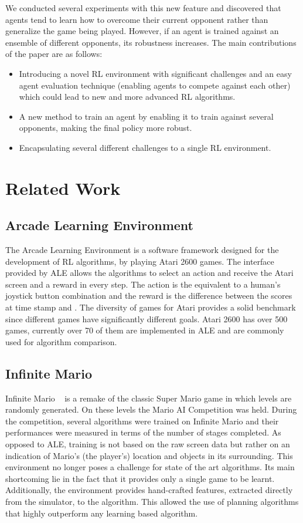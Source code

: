 \documentclass{article}
\begin{document}
We conducted several experiments with this new feature and discovered that agents tend to learn how to overcome their current opponent rather than generalize the game being played. 
However, if an agent is trained against an ensemble of different opponents, its robustness increases.
The main contributions of the paper are as follows:
\begin{itemize}
    \item Introducing a novel RL environment with significant challenges and an easy agent evaluation technique (enabling agents to compete against each other) which could lead to new and more advanced RL algorithms.
    \item A new method to train an agent by enabling it to train against several opponents, making the final policy more robust.
    \item Encapsulating several different challenges to a single RL environment.
\end{itemize}

\section{Related Work}
\subsection{Arcade Learning Environment}
The Arcade Learning Environment is a software framework designed for the development of RL algorithms, by playing Atari 2600 games. 
The interface provided by ALE allows the algorithms to select an action and receive the Atari screen and a reward in every step. 
The action is the equivalent to a human's joystick button combination and the reward is the difference between the scores at time stamp  and . 
The diversity of games for Atari provides a solid benchmark since different games have significantly different goals.
Atari 2600 has over 500 games, currently over 70 of them are implemented in ALE and are commonly used for algorithm comparison.

\subsection{Infinite Mario}
Infinite Mario ~\citep{togelius2009super} is a remake of the classic Super Mario game in which levels are randomly generated. On these levels the Mario AI Competition was held. During the competition, several algorithms were trained on Infinite Mario and their performances were measured in terms of the number of stages completed. As opposed to ALE, training is not based on the raw screen data but rather on an indication of Mario's (the player's) location and objects in its surrounding. This environment no longer poses a challenge for state of the art algorithms. Its main shortcoming lie in the fact that it provides only a single game to be learnt. Additionally, the environment provides hand-crafted features, extracted directly from the simulator, to the algorithm. This allowed the use of planning algorithms that highly outperform any learning based algorithm.
\end{document}
